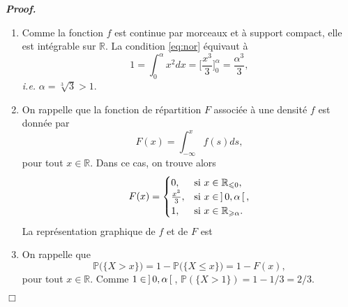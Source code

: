 \documentclass[11pt,a4paper]{article}
\newcommand{\RR}{\mathbb{R}}
\newenvironment{preuve}[1][]
{\vskip 2mm  \noindent\emph{\bf Proof#1. }}{$\Box$ \vskip 2mm}
\let\geq\geqslant
\let\leq\leqslant
\begin{document}
		\begin{preuve}
			\begin{enumerate}
				\item Comme la fonction $f$ est continue par morceaux et à support compact, elle est intégrable sur $\RR$. 
				La condition \eqref{eq:nor} équivaut à 
				\[     1 = \int_{0}^{\alpha} x^{2} dx = \bigg[ \frac{x^{3}}{3} \bigg]_{0}^{\alpha} = \frac{\alpha^{3}}{3},     \]
				\textit{i.e.} $\alpha = \sqrt[3]{3} > 1$.
				
				\item On rappelle que la fonction de répartition $F$ associée à une densité $f$ est donnée par 
				\[     F(x) = \int_{- \infty}^{x} f(s) ds,     \]
				pour tout $x \in \RR$.
				Dans ce cas, on trouve alors 
				\[     F(x)= \begin{cases}
				0, &\text{si $x \in \RR_{\leq 0}$},
				\\
				\frac{x^{3}}{3}, &\text{si $x \in \hskip 0.6mm ] \hskip 0.6mm 0,\alpha \hskip 0.6mm [ \hskip 0.6mm$,} 
				\\
				1, &\text{si $x \in \RR_{\geq \alpha}$.}
				\end{cases}
				\] 
				La représentation graphique de $f$ et de $F$ est 
				
				
				\item On rappelle que 
				\[     \mathbb{P}\big(\{X > x \}\big) = 1 - \mathbb{P}\big(\{X\leq x \}\big) = 1 - F(x),     \]
				pour tout $x \in \RR$.
				Comme $1 \in \hskip 0.6mm ] \hskip 0.6mm 0,\alpha \hskip 0.6mm [ \hskip 0.6mm$, $\mathbb{P}(\{X>1\}) = 1 - 1/3 = 2/3$. 
			\end{enumerate}
		\end{preuve} 
		
\end{document}
